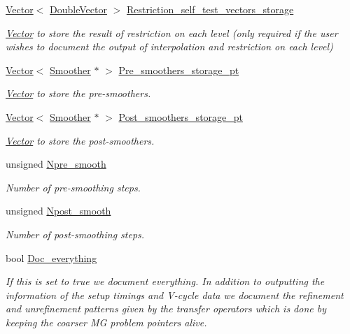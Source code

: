 \begin{DoxyCompactItemize}
\hyperlink{classoomph_1_1Vector}{Vector}$<$ \hyperlink{classoomph_1_1DoubleVector}{Double\+Vector} $>$ \hyperlink{classoomph_1_1MGSolver_a79fd640c7e43f08dca60f41d3ff91d59}{Restriction\+\_\+self\+\_\+test\+\_\+vectors\+\_\+storage}
\begin{DoxyCompactList}\small\item\em \hyperlink{classoomph_1_1Vector}{Vector} to store the result of restriction on each level (only required if the user wishes to document the output of interpolation and restriction on each level) \end{DoxyCompactList}\item 
\hyperlink{classoomph_1_1Vector}{Vector}$<$ \hyperlink{classoomph_1_1Smoother}{Smoother} $\ast$ $>$ \hyperlink{classoomph_1_1MGSolver_a50cea09c4fd325e52c6d50884095bac8}{Pre\+\_\+smoothers\+\_\+storage\+\_\+pt}
\begin{DoxyCompactList}\small\item\em \hyperlink{classoomph_1_1Vector}{Vector} to store the pre-\/smoothers. \end{DoxyCompactList}\item 
\hyperlink{classoomph_1_1Vector}{Vector}$<$ \hyperlink{classoomph_1_1Smoother}{Smoother} $\ast$ $>$ \hyperlink{classoomph_1_1MGSolver_a2b5b5a2719782ab2f43b1aa9179c814c}{Post\+\_\+smoothers\+\_\+storage\+\_\+pt}
\begin{DoxyCompactList}\small\item\em \hyperlink{classoomph_1_1Vector}{Vector} to store the post-\/smoothers. \end{DoxyCompactList}\item 
unsigned \hyperlink{classoomph_1_1MGSolver_acc27929d8448646bd1551a32db05c966}{Npre\+\_\+smooth}
\begin{DoxyCompactList}\small\item\em Number of pre-\/smoothing steps. \end{DoxyCompactList}\item 
unsigned \hyperlink{classoomph_1_1MGSolver_aa1bd9b32d6d5976582b57739bcc10b6d}{Npost\+\_\+smooth}
\begin{DoxyCompactList}\small\item\em Number of post-\/smoothing steps. \end{DoxyCompactList}\item 
bool \hyperlink{classoomph_1_1MGSolver_a3134e1d815d8d6d974f4ba4cabec2bd7}{Doc\+\_\+everything}
\begin{DoxyCompactList}\small\item\em If this is set to true we document everything. In addition to outputting the information of the setup timings and V-\/cycle data we document the refinement and unrefinement patterns given by the transfer operators which is done by keeping the coarser MG problem pointers alive. \end{DoxyCompactList}\item 

\end{DoxyCompactItemize}
